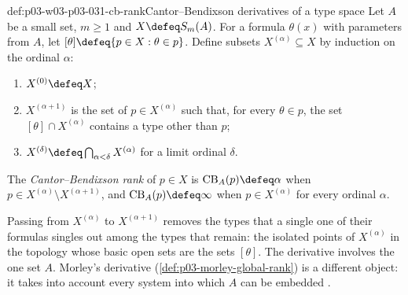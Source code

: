 \begin{hbdefinition}{def:p03-w03-p03-031-cb-rank}{Cantor--Bendixson derivatives of a type space}
Let \(A\) be a small set, \(m\geq1\) and \(X\defeq S_m(A)\).  For a formula
\(\theta(x)\) with parameters from \(A\), let
\([\theta]\defeq\{p\in X:\theta\in p\}\).  Define subsets
\(X^{(\alpha)}\subseteq X\) by induction on the ordinal \(\alpha\):
\begin{enumerate}
  \item \(X^{(0)}\defeq X\);
  \item \(X^{(\alpha+1)}\) is the set of \(p\in X^{(\alpha)}\) such that,
        for every \(\theta\in p\), the set \([\theta]\cap X^{(\alpha)}\)
        contains a type other than \(p\);
  \item \(X^{(\delta)}\defeq\bigcap_{\alpha<\delta}X^{(\alpha)}\) for a
        limit ordinal \(\delta\).
\end{enumerate}
The \emph{Cantor--Bendixson rank} of \(p\in X\) is
\(\operatorname{CB}_A(p)\defeq\alpha\) when
\(p\in X^{(\alpha)}\setminus X^{(\alpha+1)}\), and
\(\operatorname{CB}_A(p)\defeq\infty\) when \(p\in X^{(\alpha)}\) for every
ordinal \(\alpha\).
\end{hbdefinition}

Passing from \(X^{(\alpha)}\) to \(X^{(\alpha+1)}\) removes the types that
a single one of their formulas singles out among the types that remain:
the isolated points of \(X^{(\alpha)}\) in the topology whose basic open
sets are the sets \([\theta]\).  The derivative involves the one set
\(A\).  Morley's derivative (\cref{def:p03-morley-global-rank}) is a
different object: it takes into account every system into which \(A\) can
be embedded \cite[Definition~2.2, p.~520]{Morley1965}.

